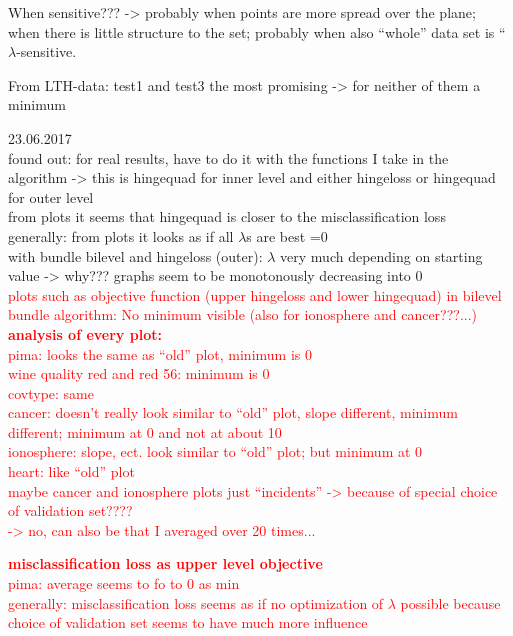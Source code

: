 When sensitive??? -> probably when points are more spread over the plane; when there is little structure to the set; probably when also ``whole'' data set is ``\(\lambda\)-sensitive.

From LTH-data: test1 and test3 the most promising -> for neither of them a minimum



23.06.2017\\
found out: for real results, have to do it with the functions I take in the algorithm -> this is hingequad for inner level and either hingeloss or hingequad for outer level\\
from plots it seems that hingequad is closer to the misclassification loss\\
generally: from plots it looks as if all \(\lambda\)s are best =0\\
with bundle bilevel and hingeloss (outer): \(\lambda\) very much depending on starting value -> why??? graphs seem to be monotonously decreasing into 0  \\


\textcolor{red}{plots such as objective function (upper hingeloss and lower hingequad) in bilevel bundle algorithm: No minimum visible (also for ionosphere and cancer???...)\\
\textbf{analysis of every plot:}\\
pima: looks the same as ``old'' plot, minimum is 0\\
wine quality red and red 56: minimum is 0 \\
covtype: same\\
cancer: doesn't really look similar to ``old'' plot, slope different, minimum different; minimum at 0 and not at about 10\\
ionosphere: slope, ect. look similar to ``old'' plot; but minimum at 0 \\
heart: like ``old'' plot \\
maybe cancer and ionosphere plots just ``incidents'' -> because of special choice of validation set????\\
-> no, can also be that I averaged over 20 times...}

\textcolor{red}{\textbf{misclassification loss as upper level objective}\\
pima: average seems to fo to 0 as min \\
generally: misclassification loss seems as if no optimization of \(\lambda\) possible because choice of validation set seems to have much more influence}

